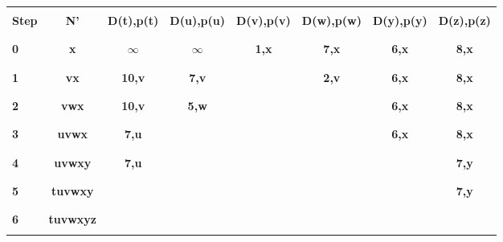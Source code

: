 \documentclass[12pt]{report}
\begin{document}
	\begin{center}
		\begin{tabular}{| p{1cm} | c | c | c | c | c | c | c |}
			\hline
			&&&&&&& \\
			\textbf{Step} & \textbf{N'} & \textbf{D(t),p(t)} & \textbf{D(u),p(u)} & \textbf{D(v),p(v)} & \textbf{D(w),p(w)} & \textbf{D(y),p(y)} & \textbf{D(z),p(z)} \\
			&&&&&&& \\
			
			\hline
			&&&&&&&\\[1pt]
			\textbf{0} & \textbf{x} & \textbf{$\infty$} & \textbf{$\infty$} & \textbf{1,x} & \textbf{7,x} & \textbf{6,x} & \textbf{8,x}\\
			&&&&&&& \\[1pt]
			\hline
			
			&&&&&&& \\[1pt]
			\textbf{1} & \textbf{vx} & \textbf{10,v} & \textbf{7,v} & & \textbf{2,v} & \textbf{6,x} & \textbf{8,x}\\
			&&&&&&& \\[1pt]
			\hline
			
			&&&&&&& \\[1pt]
			\textbf{2} & \textbf{vwx} & \textbf{10,v} & \textbf{5,w} & & & \textbf{6,x} & \textbf{8,x} \\
			&&&&&&& \\[1pt]
			\hline
			
			&&&&&&& \\[1pt]
			\textbf{3} & \textbf{uvwx} & \textbf{7,u} & & & & \textbf{6,x} & \textbf{8,x} \\
			&&&&&&& \\[1pt]
			\hline
			
			&&&&&&& \\[1pt]
			\textbf{4} & \textbf{uvwxy} & \textbf{7,u} & & & & & \textbf{7,y}\\
			&&&&&&& \\[1pt]
			\hline
			
			&&&&&&& \\[1pt]
			\textbf{5} & \textbf{tuvwxy} & & & & & & \textbf{7,y}\\
			&&&&&&& \\[1pt]
			\hline
			&&&&&&& \\[1pt]
			\textbf{6} & \textbf{tuvwxyz} & & & & & &\\
			&&&&&&& \\[1pt]
			\hline
		\end{tabular}
		\\[10pt]
	\end{center}
	
\end{document}
